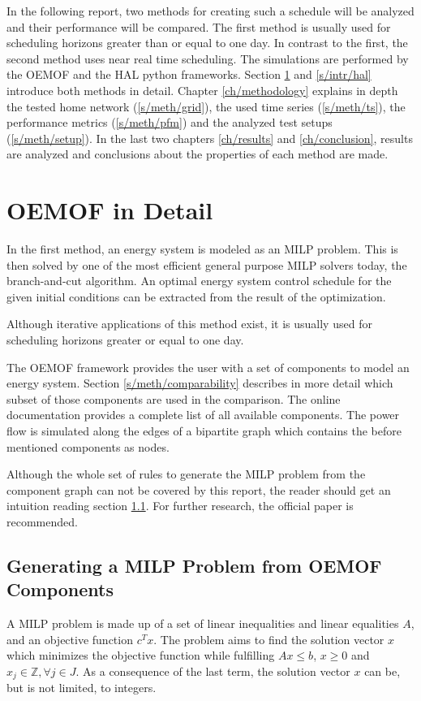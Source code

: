 \documentclass[a4paper,12pt]{book}
\theoremstyle{break}
\begin{document}
In the following report, two methods for creating such a schedule will be analyzed and their performance will be compared.
The first method is usually used for scheduling horizons greater than or equal to one day. In contrast to the first, the second method uses near real time scheduling. The simulations are performed by the \ac{OEMOF} and the HAL python frameworks.
Section \ref{s/intr/oemof} and \ref{s/intr/hal} introduce both methods in detail.
Chapter \ref{ch/methodology} explains in depth the tested home network (\ref{s/meth/grid}), the used time series (\ref{s/meth/ts}), the performance metrics (\ref{s/meth/pfm}) and the analyzed test setups (\ref{s/meth/setup}).
In the last two chapters \ref{ch/results} and \ref{ch/conclusion}, results are analyzed and conclusions about the properties of each method are made.


\section{OEMOF in Detail}\label{s/intr/oemof}
In the first method, an energy system is modeled as an \ac{MILP} problem. This is then solved by one of the most efficient general purpose \ac{MILP} solvers today, the branch-and-cut algorithm\cite{branchAndCutEfficient}. An optimal energy system control schedule for the given initial conditions can be extracted from the result of the optimization.

Although iterative applications of this method exist, it is usually used for scheduling horizons greater or equal to one day\cite{strategicScheduling}\cite{schedulingMilp}.

The \ac{OEMOF} framework provides the user with a set of components to model an energy system. Section \ref{s/meth/comparability} describes in more detail which subset of those components are used in the comparison. The online documentation provides a complete list of all available components. \cite{oemofDoc}
The power flow is simulated along the edges of a bipartite graph which contains the before mentioned components as nodes.

Although the whole set of rules to generate the \ac{MILP} problem from the component graph can not be covered by this report, the reader should get an intuition reading section \ref{s/intr/oemof/milp}. For further research, the official paper is recommended. \cite{oemof}

\subsection{Generating a MILP Problem from OEMOF Components}\label{s/intr/oemof/milp}
A \ac{MILP} problem is made up of a set of linear inequalities and linear equalities $A$, and an objective function $c^Tx$. The problem aims to find the solution vector $x$ which minimizes the objective function while fulfilling  $Ax \leq b$,  $x \geq 0$ and $x_j \in \mathbb{Z}, \forall j \in J$. As a consequence of the last term, the solution vector $x$ can be, but is not limited, to integers.
\end{document}
